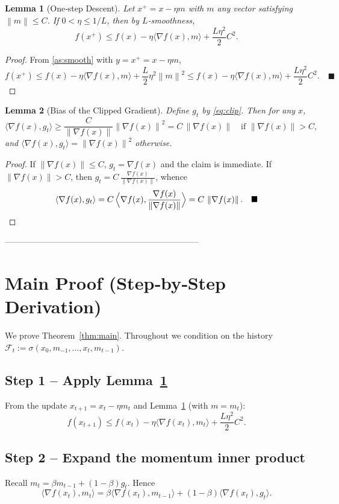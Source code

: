 \documentclass{article}
\newtheorem{lemma}{Lemma}
\newcommand{\norm}[1]{\left\lVert#1\right\rVert}
\begin{document}
\begin{lemma}[One‑step Descent]\label{lem:descent}
Let $x^{+}=x-\eta m$ with $m$ any vector satisfying $\norm{m}\le C$.  
If $0<\eta\le 1/L$, then by $L$‑smoothness,
\[
f(x^{+})\le f(x)-\eta\langle\nabla f(x),m\rangle+\frac{L\eta^{2}}{2}C^{2}.
\]
\end{lemma}
\begin{proof}
From \ref{as:smooth} with $y=x^{+}=x-\eta m$,
\[
f(x^{+})\le f(x)-\eta\langle\nabla f(x),m\rangle+\frac{L}{2}\eta^{2}\norm{m}^{2}
\le f(x)-\eta\langle\nabla f(x),m\rangle+\frac{L\eta^{2}}{2}C^{2}. \quad\blacksquare
\]
\end{proof}

\begin{lemma}[Bias of the Clipped Gradient]\label{lem:bias}
Define $g_{t}$ by \eqref{eq:clip}. Then for any $x$,
\[
\langle\nabla f(x),g_{t}\rangle
\ge \frac{C}{\norm{\nabla f(x)}}\norm{\nabla f(x)}^{2}
= C\,\norm{\nabla f(x)}\quad\text{if }\norm{\nabla f(x)}>C,
\]
and $\langle\nabla f(x),g_{t}\rangle=\norm{\nabla f(x)}^{2}$ otherwise.
\end{lemma}
\begin{proof}
If $\norm{\nabla f(x)}\le C$, $g_{t}=\nabla f(x)$ and the claim is immediate.  
If $\norm{\nabla f(x)}>C$, then $g_{t}=C\,\frac{\nabla f(x)}{\norm{\nabla f(x)}}$, whence
\[
\langle\nabla f(x),g_{t}\rangle
= C\,\Bigl\langle\nabla f(x),\frac{\nabla f(x)}{\norm{\nabla f(x)}}\Bigr\rangle
= C\,\norm{\nabla f(x)}. \quad\blacksquare
\]
\end{proof}

---------------------------------------------------------------------

\section*{Main Proof (Step‑by‑Step Derivation)}
We prove Theorem~\ref{thm:main}. Throughout we condition on the history $\mathcal{F}_{t}:=\sigma(x_{0},m_{-1},\dots,x_{t},m_{t-1})$.

\subsection*{Step 1 – Apply Lemma~\ref{lem:descent}}
From the update $x_{t+1}=x_{t}-\eta m_{t}$ and Lemma~\ref{lem:descent} (with $m=m_{t}$):
\[
f(x_{t+1})\le f(x_{t})-\eta\langle\nabla f(x_{t}),m_{t}\rangle+\frac{L\eta^{2}}{2}C^{2}.
\tag{1}\label{eq:descent}
\]

\subsection*{Step 2 – Expand the momentum inner product}
Recall $m_{t}= \beta m_{t-1}+(1-\beta)g_{t}$.
Hence
\[
\langle\nabla f(x_{t}),m_{t}\rangle
= \beta\langle\nabla f(x_{t}),m_{t-1}\rangle+(1-\beta)\langle\nabla f(x_{t}),g_{t}\rangle.
\tag{2}\label{eq:inner}
\]
\end{document}
